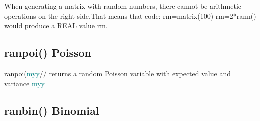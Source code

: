 \begin{note}
When generating a matrix with random numbers, there cannot be
arithmetic operations on the right side.That means that code:\newline
rm=\textcolor{VioletRed}{matrix}(100)\newline
rm=2*rann()\newline
would produce a REAL value rm.
\end{note}

\subsection{\textcolor{VioletRed}{ranpoi}() Poisson}
\label{ranpoi}
\textcolor{VioletRed}{ranpoi}(\textcolor{teal}{myy}//
returns a random Poisson variable with expected value and variance \textcolor{teal}{myy}
\subsection{\textcolor{VioletRed}{ranbin}() Binomial}
\label{ranbin}

